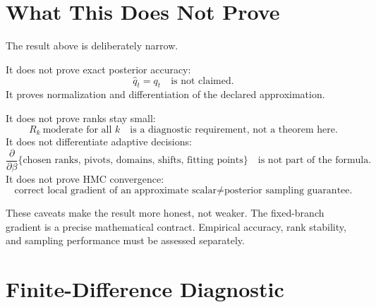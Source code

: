 \documentclass[11pt]{article}
\begin{document}
\section{What This Does Not Prove}

The result above is deliberately narrow.

It does not prove exact posterior accuracy:
\[
    \widehat q_t=q_t
    \quad\text{is not claimed.}
    \tag{P19-90}
\]
It proves normalization and differentiation of the declared approximation.

It does not prove ranks stay small:
\[
    R_k\ \text{moderate for all }k
    \quad\text{is a diagnostic requirement, not a theorem here.}
    \tag{P19-91}
\]
It does not differentiate adaptive decisions:
\[
    \frac{\partial}{\partial\beta}
    \{\text{chosen ranks, pivots, domains, shifts, fitting points}\}
    \quad\text{is not part of the formula.}
    \tag{P19-92}
\]
It does not prove HMC convergence:
\[
    \text{correct local gradient of an approximate scalar}
    \ne
    \text{posterior sampling guarantee.}
    \tag{P19-93}
\]

These caveats make the result more honest, not weaker.  The fixed-branch
gradient is a precise mathematical contract.  Empirical accuracy, rank
stability, and sampling performance must be assessed separately.

\section{Finite-Difference Diagnostic}
\end{document}
